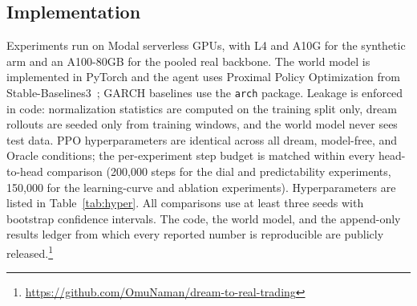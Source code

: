 \documentclass[conference]{IEEEtran}
\begin{document}
\subsection{Implementation}
Experiments run on Modal serverless GPUs, with L4 and A10G for the synthetic arm and an A100-80GB for the pooled real backbone. The world model is implemented in PyTorch and the agent uses Proximal Policy Optimization from Stable-Baselines3~\cite{sb3}; GARCH baselines use the \texttt{arch} package. Leakage is enforced in code: normalization statistics are computed on the training split only, dream rollouts are seeded only from training windows, and the world model never sees test data. PPO hyperparameters are identical across all dream, model-free, and Oracle conditions; the per-experiment step budget is matched within every head-to-head comparison (200{,}000 steps for the dial and predictability experiments, 150{,}000 for the learning-curve and ablation experiments). Hyperparameters are listed in Table~\ref{tab:hyper}. All comparisons use at least three seeds with bootstrap confidence intervals. The code, the world model, and the append-only results ledger from which every reported number is reproducible are publicly released.\footnote{\url{https://github.com/OmuNaman/dream-to-real-trading}}

\begin{table}[!t]
\caption{Hyperparameters and synthetic-generator parameters. All values are fixed across conditions; the per-experiment PPO step budget is matched within every head-to-head comparison.}
\label{tab:hyper}
\centering
{}
\end{table}
\end{document}
